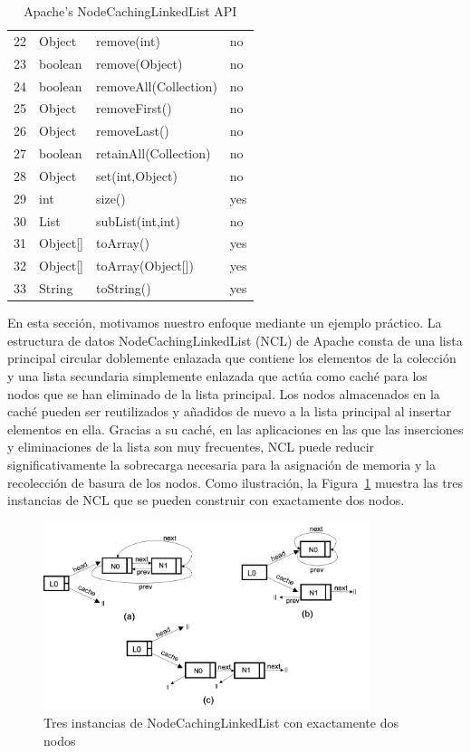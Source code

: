 \begin{table}[H]
{\begin{tabular}{|l|l|l|l|}
    22&Object&remove(int) &no\\
    23&boolean&remove(Object) & no \\
    24&boolean&removeAll(Collection) & no \\
    25&Object&removeFirst() &no\\
    26&Object&removeLast() &no\\
    27&boolean&retainAll(Collection) &no \\
    28&Object&set(int,Object) &no\\
    29&int&size() &yes\\
    30&List&subList(int,int) & no \\
    31&Object[]&toArray() & yes \\
    32&Object[]&toArray(Object[]) &yes\\
    33&String&toString() & yes \\
\hline
\end{tabular}
}
\caption{Apache's NodeCachingLinkedList API}
\label{tab:ncl-api}
\end{table} 
En esta sección, motivamos nuestro enfoque mediante un ejemplo práctico. La estructura de datos NodeCachingLinkedList (NCL) de Apache \cite{apache} consta de una lista principal circular doblemente enlazada  que contiene los elementos de la colección y una lista secundaria simplemente enlazada que actúa como caché para los nodos que se han eliminado de la lista principal. Los nodos almacenados en la caché pueden ser reutilizados y añadidos de nuevo a la lista principal al insertar elementos en ella. Gracias a su caché, en las aplicaciones en las que las inserciones y eliminaciones de la lista son muy frecuentes, NCL puede reducir significativamente la sobrecarga necesaria para la asignación de memoria y la recolección de basura de los nodos. 
Como ilustración, la Figura~\ref{fig:ncl-instances} muestra las tres instancias de NCL que se pueden construir con exactamente dos nodos.


\begin{figure}[H]
    \centering
    \includegraphics[width=0.85\textwidth]{NCL-instances.png}
    \caption{Tres instancias de NodeCachingLinkedList con exactamente dos nodos}
    \label{fig:ncl-instances}
\end{figure}


